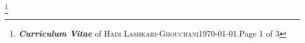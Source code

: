 \documentclass[10pt]{article}
\newcommand{\maxpages}{3}
\newcommand{\maxpages}{3}
\newcommand{\FootNote}[1]{\let\thefootnote\relax\footnote{\textbf{\textit{Curriculum Vitae}} of \textsc{Hadi Lashkari-Ghouchani}\qquad\today.\qquad Page #1 of \maxpages}}
\begin{document}

\FootNote{1}


\newcommand{\WorkExperience}[9]{
    \multicolumn{3}{l}{\textbf{\textsl{ #1}}}\\
    \quad#2&%
        \ifthenelse{\equal{#4}{Teacher}}
            {%
                \textit{Responsibility:} #4\\
                \quad#3&\textit{Courses Taught:} #5}
            {}%
        \ifthenelse{\equal{#4}{Open Source}}
            {%
                #4\\
                \quad#3
                &\textit{Implemented by:} #5. \textit{Source:} #6\\
                &\textit{Implemented by:} #7. \textit{Source:} #8}
            {}%
        \ifthenelse{\equal{#4}{Programmer}}
            {%
                \textit{Responsibility:} #4\\
                \quad#3
                &\textit{Languages:} \texttt{#5}\\
                &\textit{Project:} #6\\
                &\textit{Project:} #7
            }
            {}%
        \ifthenelse{\equal{#4}{Senior Android Developer}}
            {%
                \textit{Responsibility:} #4\\
                \quad#3
                &\textit{Project:} #5\\
                &       \quad\quad #6\\
                &       \quad\quad #7\\
                &\textit{Project:} #8\\
                &       \quad\quad #9
            }
            {}%
            \\
}

\newcommand{\WorkExperienceHasinOne}[9]{
                &\textit{Project:} #1\\
                &       \quad\quad #2\\
                &\textit{Project:} #3\\
                &       \quad\quad #4\\
                &\textit{Project:} #5\\
                &\textit{Project:} #6\\
                &       \quad\quad #7\\
                &       \quad\quad #8\\
                &       \quad\quad #9\\
}
\end{document}
